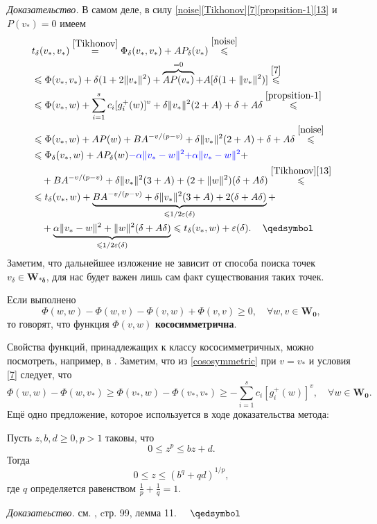 \noindent\emph{Доказательство.} В самом деле, в силу \eqref{noise}\eqref{Tikhonov}\eqref{7}\eqref{propsition-1}\eqref{13} и $P(v_*)=0$ имеем
\begin{align}
&t_{\delta}(v_*,v_*)\stackrel{\eqref{Tikhonov}}{=}\Phi_{\delta}(v_*,v_*)+AP_{\delta}(v_*)\stackrel{\eqref{noise}}{\leqslant}\notag\\
&\leqslant\Phi(v_*,v_*)+\delta(1+2\|v_*\|^2)+\overbrace{AP(v_*)}^{=0}+A[\delta(1+\|v_*\|^2)]\stackrel{\eqref{7}}{\leqslant}\notag\\
&\leqslant \Phi(v_*,w)+\sum_{i=1}^{s}c_i[g_i^+(w)]^v+\delta\|v_*\|^2(2+A)+\delta+A\delta\stackrel{\eqref{propsition-1}}{\leqslant}\notag\\
&\leqslant\Phi(v_*,w)+AP(w)+BA^{-v/(p-v)}+\delta\|v_*\|^2(2+A)+\delta+A\delta\stackrel{\eqref{noise}}{\leqslant}\\
&\leqslant \Phi_{\delta}(v_*,w)+AP_{\delta}(w)\textcolor{blue}{-\alpha\|v_*-w\|^2}\textcolor{blue}{+\alpha\|v_*-w\|^2}+\notag\\
&\quad +BA^{-v/(p-v)}+\delta\|v_*\|^2(3+A)+(2+\|w\|^2)(\delta+A\delta)\stackrel{\eqref{Tikhonov}\eqref{13}}{\leqslant}\notag\\
&\leqslant t_{\delta}(v_*,w)+\underbrace{BA^{-v/(p-v)}+\delta\|v_*\|^2(3+A)+2(\delta+A\delta)}_{\leqslant 1/2\varepsilon(\delta)}+\notag\\
&\quad +\underbrace{\alpha\|v_*-w\|^2+\|w\|^2(\delta+A\delta)}_{\leqslant 1/2\varepsilon(\delta)}\leqslant t_{\delta}(v_*,w)+\varepsilon(\delta).\,\quad \qedsymbol \notag
\end{align}
Заметим, что дальнейшее изложение не зависит от способа поиска
точек $v_{\delta}\in\mathbf{W_{*\delta}}$, для нас будет важен лишь сам факт существования таких точек.
\begin{defin}
	Если выполнено
	\begin{equation}
	\label{cososymmetric}
	\Phi(w,w)-\Phi(w,v)-\Phi(v,w)+\Phi(v,v)\geqslant 0,\quad \forall w,v\in\mathbf{W_0},
	\end{equation}
	то говорят, что функция $\Phi(v,w)$ \textbf{кососимметрична}. 
\end{defin}
\noindent Свойства функций, принадлежащих к классу кососимметричных, можно посмотреть, например, в \cite{8}. Заметим, что из \eqref{cososymmetric} при $v=v_*$ и условия \eqref{7} следует, что 
\begin{equation}
\label{15}
\Phi(w,w)-\Phi(w,v_*)\geqslant \Phi(v_*,w)-\Phi(v_*,v_*)\geqslant -\sum_{i=1}^{s}c_i[g_i^+(w)]^v,\quad \forall w\in\mathbf{W_0}.
\end{equation}
\noindent Ещё одно предложение, которое используется в ходе доказательства метода:
\begin{prop}
	\label{lemma11}
	Пусть $z,b,d\geqslant 0,p>1$ таковы, что
	\begin{equation}
	0\leqslant z^p\leqslant bz+d.
	\end{equation}
	Тогда
	\begin{equation}
	0\leqslant z\leqslant (b^q+qd)^{1/p},
	\end{equation}
	где $q$ определяется равенством $\frac{1}{p}+\frac{1}{q}=1$.
\end{prop}
\noindent\emph{Доказатеьство.} см. \cite{numMethodopt}, cтр. 99, лемма 11. $\quad\qedsymbol$
